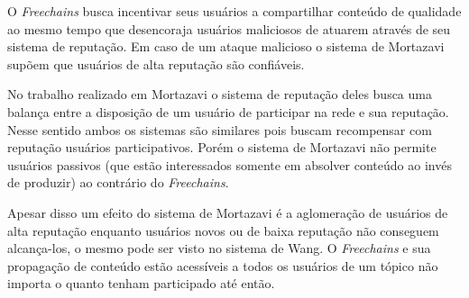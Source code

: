 \documentclass[12pt]{article}
\newcommand{\FC} {\textit{Freechains}\xspace}
\begin{document}
O \FC busca incentivar seus usuários a compartilhar conteúdo de qualidade ao mesmo tempo que desencoraja usuários maliciosos de atuarem através de seu sistema de reputação.
Em caso de um ataque malicioso o sistema de Mortazavi supõem que usuários de alta reputação são confiáveis.

No trabalho realizado em Mortazavi o sistema de reputação deles busca uma balança entre a disposição de um usuário de participar na rede e sua reputação. 
Nesse sentido ambos os sistemas são similares pois buscam recompensar com reputação usuários participativos.
Porém o sistema de Mortazavi não permite usuários passivos (que estão interessados somente em absolver conteúdo ao invés de produzir) ao contrário do \FC.

Apesar disso um efeito do sistema de Mortazavi é a aglomeração de usuários de alta reputação enquanto usuários novos ou de baixa reputação não conseguem alcança-los, o mesmo pode ser visto no sistema de Wang. 
O \FC e sua propagação de conteúdo estão acessíveis a todos os usuários de um tópico não importa o quanto tenham participado até então.



\end{document}
